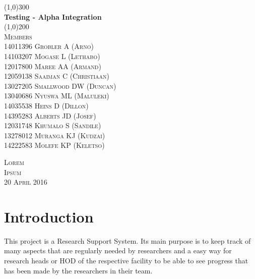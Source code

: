 \documentclass{article}
\begin{document}
\begin{titlepage}
    \begin{center}
        \line(1,0){300}\\
        [6mm]
        \huge{\bfseries Testing - Alpha Integration}\\
        [2mm]
        \line(1,0){200}\\
        [15mm]
        \textsc{\large Members}\\
        [7.5mm]
        \textsc{
                \large14011396  Grobler A (Arno) \\
                14103207    Mogase  L (Lethabo)\\
                12017800    Maree   AA (Armand)\\
                12059138    Saaiman C (Christiaan)\\
                13027205    Smallwood   DW (Duncan)\\
                13040686    Nyuswa  ML (Maluleki)\\
                14035538    Heins   D (Dillon)\\
                14395283    Alberts JD (Josef)\\
                12031748    Khumalo S (Sandile)\\
                13278012    Muranga KJ (Kudzai)\\
                14222583    Molefe  KP (Keletso)\\
                [8cm]
            }

    \end{center}

    \begin{flushright}
        \textsc{\large Lorem\\
        Ipsum\\
        20 April 2016\\}
    \end{flushright}
\end{titlepage}

\tableofcontents
\thispagestyle{empty}
\cleardoublepage
%

\setcounter{page}{1}
%

\section{Introduction}\label{sec:intro}
    This project is a Research Support System. Its main purpose is to keep track of many aspects that are regularly needed by researchers and a easy way for research heads or HOD of the respective facility to be able to see progress that has been made by the researchers in their team.
    
\end{document}
